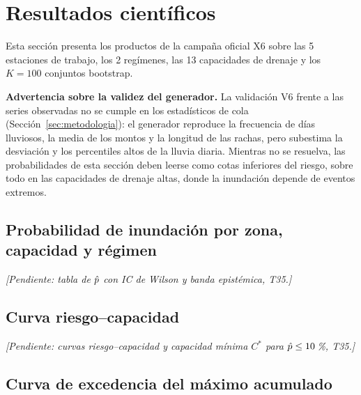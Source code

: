 \section{Resultados científicos}
\label{sec:resultados}

Esta sección presenta los productos de la campaña oficial X6 sobre las 5 estaciones de trabajo, los 2 regímenes, las 13 capacidades de drenaje y los $K = 100$ conjuntos bootstrap.

\textbf{Advertencia sobre la validez del generador.} La validación V6 frente a las series observadas no se cumple en los estadísticos de cola (Sección~\ref{sec:metodologia}): el generador reproduce la frecuencia de días lluviosos, la media de los montos y la longitud de las rachas, pero subestima la desviación y los percentiles altos de la lluvia diaria. Mientras no se resuelva, las probabilidades de esta sección deben leerse como cotas inferiores del riesgo, sobre todo en las capacidades de drenaje altas, donde la inundación depende de eventos extremos.

\subsection{Probabilidad de inundación por zona, capacidad y régimen}

\textit{[Pendiente: tabla de $\hat{p}$ con IC de Wilson y banda epistémica, T35.]}

\subsection{Curva riesgo--capacidad}

\textit{[Pendiente: curvas riesgo--capacidad y capacidad mínima $C^{*}$ para $\hat{p} \le 10$\,\%, T35.]}

\subsection{Curva de excedencia del máximo acumulado}

